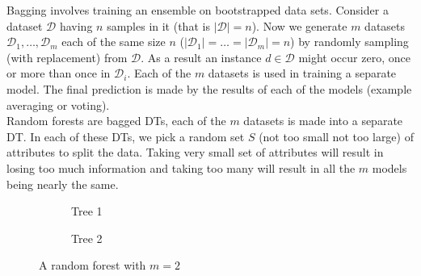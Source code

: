 Bagging involves training an ensemble on bootstrapped data sets. Consider a dataset $\mathcal{D}$ having $n$ samples in it (that is $|\mathcal{D}| = n$). Now we generate $m$ datasets $\mathcal{D}_1,\dots,\mathcal{D}_m$ each of the same size $n$ ($|\mathcal{D}_1| = \dots = |\mathcal{D}_m| = n$) by randomly sampling (with replacement) from $\mathcal{D}$. As a result an instance  $d \in \mathcal{D}$ might occur zero, once or more than once in $\mathcal{D}_i$. Each of the $m$ datasets is used in training a separate model. The final prediction is made by  the results of each of the models (example averaging or voting). \\

Random forests are bagged DTs, each of the $m$ datasets is made into a separate DT. In each of these DTs, we pick a random set $S$ (not too small not too large) of attributes to split the data. Taking very small set of attributes will result in losing too much information and taking too many will result in all the $m$ models being nearly the same. \\

\begin{figure}[H]
  \centering
  \begin{subfigure}[t]{0.45\textwidth}
    \caption{Tree 1}
  \end{subfigure}
  \begin{subfigure}[t]{0.45\textwidth}
    \caption{Tree 2}
  \end{subfigure}
  \caption{A random forest with $m = 2$}
\end{figure}